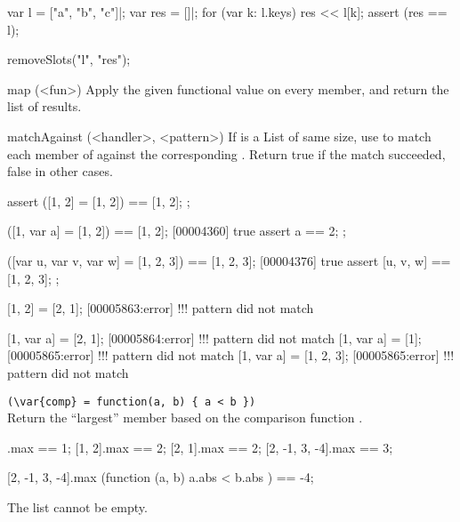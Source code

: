 \begin{urbiscriptapi}
\begin{urbiscript}
var l = ["a", "b", "c"]|;
var res = []|;
for (var k: l.keys)
  res << l[k];
assert (res == l);
\end{urbiscript}
\begin{urbicomment}
removeSlots("l", "res");
\end{urbicomment}


\item[map](<fun>)%
  Apply the given functional value on every member, and return the list of
  results.



\item[matchAgainst](<handler>, <pattern>)%
  If  is a List of same size, use  to match each
  member of \this against the corresponding .  Return true if
  the match succeeded, false in other cases.
\begin{urbiscript}
assert
{
  ([1, 2] = [1, 2]) == [1, 2];
};

([1, var a] = [1, 2]) == [1, 2];
[00004360] true
assert
{
  a == 2;
};

([var u, var v, var w] = [1, 2, 3]) == [1, 2, 3];
[00004376] true
assert
{
  [u, v, w] == [1, 2, 3];
};

[1, 2] = [2, 1];
[00005863:error] !!! pattern did not match

[1, var a] = [2, 1];
[00005864:error] !!! pattern did not match
[1, var a] = [1];
[00005865:error] !!! pattern did not match
[1, var a] = [1, 2, 3];
[00005865:error] !!! pattern did not match
\end{urbiscript}


\item {}\lstinline|(\var{comp} = function(a, b) { a < b })|\\%
  Return the ``largest'' member based on the comparison function .
\begin{urbiassert}
           [1].max == 1;
        [1, 2].max == 2;
        [2, 1].max == 2;
[2, -1, 3, -4].max == 3;

[2, -1, 3, -4].max (function (a, b) { a.abs < b.abs }) == -4;
\end{urbiassert}

The list cannot be empty.


\end{urbiscriptapi}
